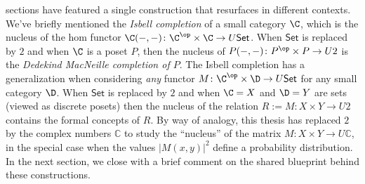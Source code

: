 sections have featured a single construction that resurfaces in different contexts. We've briefly mentioned the \textit{Isbell completion} of a small category $\C$, which is the nucleus of the hom functor $\C(-,-)\colon \C^{\op}\times \C\to U\mathsf{Set}$. When $\mathsf{Set}$ is replaced by $2$ and when $\C$ is a poset $P$, then the nucleus of $P(-,-)\colon P^{\op}\times P\to U2$ is the \textit{Dedekind MacNeille completion of $P$}. The Isbell completion has a generalization when considering \textit{any} functor $M\colon \C^{\op}\times \D\to U\mathsf{Set}$ for any small category $\D$. When $\mathsf{Set}$ is replaced by $2$ and when $\C=X$ and $\D=Y$ are sets (viewed as discrete posets) then the nucleus of the relation $R:=M\colon X\times Y\to U2$ contains the formal concepts of $R$. By way of analogy, this thesis has replaced $2$ by the complex numbers $\mathbb{C}$ to study the ``nucleus'' of the matrix $M\colon X\times Y\to U\mathbb{C}$, in the special case when the values $|M(x,y)|^2$ define a probability distribution. In the next section, we close with a brief comment on the shared blueprint behind these constructions.




